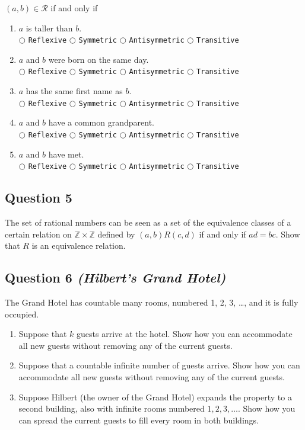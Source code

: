 \documentclass{article}
\begin{document}
$(a,b)\in \mathcal{R}$ if and only if
\begin{enumerate}
\item $a$ is taller than $b$.\\
$\bigcirc$ \texttt{Reflexive} \quad $\bigcirc$ \texttt{Symmetric} \quad $\bigcirc$ \texttt{Antisymmetric} \quad $\bigcirc$ \texttt{Transitive}

\item $a$ and $b$ were born on the same day.\\
$\bigcirc$ \texttt{Reflexive} \quad $\bigcirc$ \texttt{Symmetric} \quad $\bigcirc$ \texttt{Antisymmetric} \quad $\bigcirc$ \texttt{Transitive}

\item $a$ has the same first name as $b$.\\
$\bigcirc$ \texttt{Reflexive} \quad $\bigcirc$ \texttt{Symmetric} \quad $\bigcirc$ \texttt{Antisymmetric} \quad $\bigcirc$ \texttt{Transitive}

\item $a$ and $b$ have a common grandparent.\\
$\bigcirc$ \texttt{Reflexive} \quad $\bigcirc$ \texttt{Symmetric} \quad $\bigcirc$ \texttt{Antisymmetric} \quad $\bigcirc$ \texttt{Transitive}

\item $a$ and $b$ have met.\\ 
$\bigcirc$ \texttt{Reflexive} \quad $\bigcirc$ \texttt{Symmetric} \quad $\bigcirc$ \texttt{Antisymmetric} \quad $\bigcirc$ \texttt{Transitive}

\end{enumerate}

\subsection*{Question 5}
The set of rational numbers can be seen as a set of the equivalence classes of a certain relation on $\mathbb{Z} \times \mathbb{Z}$ defined by $(a, b)R(c, d)$ if and only if $ad = bc$. Show that $R$ is an equivalence relation.


\subsection*{Question 6 \textit{(Hilbert's Grand Hotel)}}
     The Grand Hotel has countable many rooms, numbered 1, 2, 3, \dots, and it is fully occupied.
    \begin{enumerate}
        \item Suppose that $k$ guests arrive at the hotel. Show how you can accommodate all new guests without removing any of the current guests.
        \item Suppose that a countable infinite number of guests arrive. Show how you can accommodate all new guests without removing any of the current guests.
        \item Suppose Hilbert (the owner of the Grand Hotel) expands the property to a second building, also with infinite rooms numbered $1, 2, 3, \dots$. Show how you can spread the current guests to fill every room in both buildings.
    \end{enumerate}
\end{document}
